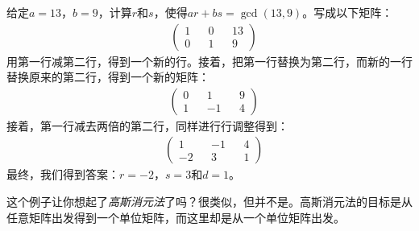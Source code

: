 \begin{example}
\label{exm:egcd2}
	给定$a = 13$，$b = 9$，计算$r$和$s$，使得$ar + bs = \gcd(13, 9)$。写成以下矩阵：
		\begin{align}
		  &\begin{pmatrix} 
		   1 && 0 && 13\\
		   0 && 1 && 9
		\end{pmatrix}
		\end{align}
	用第一行减第二行，得到一个新的行。接着，把第一行替换为第二行，而新的一行替换原来的第二行，得到一个新的矩阵：
	   \begin{align}
	      &\begin{pmatrix} 
	      0 && 1 && 9\\
	      1 && -1 && 4
	   \end{pmatrix}
	\end{align}
	接着，第一行减去两倍的第二行，同样进行行调整得到：
	     \begin{align}
	        &\begin{pmatrix} 
	         1 && -1 && 4\\
	         -2 && 3 && 1
	      \end{pmatrix}
	\end{align}
	最终，我们得到答案：$r = -2$，$s = 3$和$d = 1$。
\end{example}
这个例子让你想起了\emph{高斯消元法}了吗？很类似，但并不是。高斯消元法的目标是从任意矩阵出发得到一个单位矩阵，而这里却是从一个单位矩阵出发。

